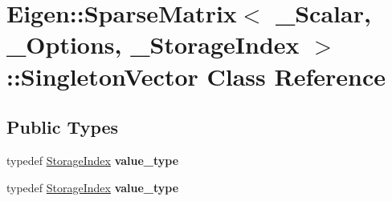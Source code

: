\hypertarget{class_eigen_1_1_sparse_matrix_1_1_singleton_vector}{}\section{Eigen\+:\+:Sparse\+Matrix$<$ \+\_\+\+Scalar, \+\_\+\+Options, \+\_\+\+Storage\+Index $>$\+:\+:Singleton\+Vector Class Reference}
\label{class_eigen_1_1_sparse_matrix_1_1_singleton_vector}
\subsection*{Public Types}
\begin{DoxyCompactItemize}
\item 
\mbox{\label{class_eigen_1_1_sparse_matrix_1_1_singleton_vector_ac912d690af0c5664bdae85d12bd9151e}} 
typedef \hyperlink{group___sparse_core___module_a0b540ba724726ebe953f8c0df06081ed}{Storage\+Index} {\bfseries value\+\_\+type}
\item 
\mbox{\label{class_eigen_1_1_sparse_matrix_1_1_singleton_vector_ac912d690af0c5664bdae85d12bd9151e}} 
typedef \hyperlink{group___sparse_core___module_a0b540ba724726ebe953f8c0df06081ed}{Storage\+Index} {\bfseries value\+\_\+type}
\end{DoxyCompactItemize}
